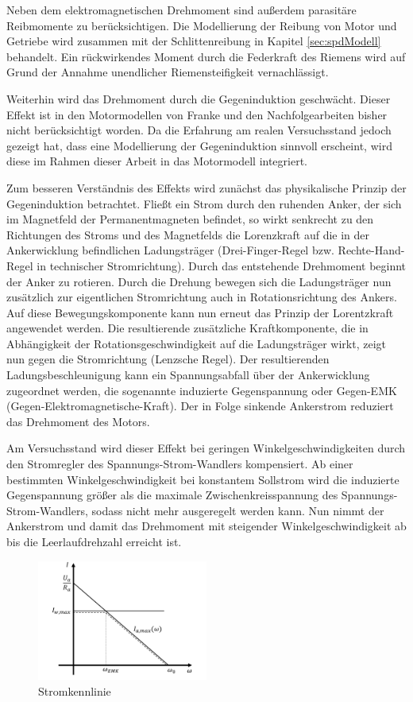 Neben dem elektromagnetischen Drehmoment sind außerdem parasitäre Reibmomente zu berücksichtigen. Die Modellierung der Reibung von Motor und Getriebe wird zusammen mit der Schlittenreibung in Kapitel \ref{sec:spdModell} behandelt. Ein rückwirkendes Moment durch die Federkraft des Riemens wird auf Grund der Annahme unendlicher Riemensteifigkeit vernachlässigt. 

Weiterhin wird das Drehmoment durch die Gegeninduktion geschwächt. Dieser Effekt ist in den Motormodellen von Franke \cite{franke} und den Nachfolgearbeiten bisher nicht berücksichtigt worden. Da die Erfahrung am realen Versuchsstand jedoch gezeigt hat, dass eine Modellierung der Gegeninduktion sinnvoll erscheint, wird diese im Rahmen dieser Arbeit in das Motormodell integriert.

Zum besseren Verständnis des Effekts wird zunächst das physikalische Prinzip der Gegeninduktion betrachtet. Fließt ein Strom durch den ruhenden Anker, der sich im Magnetfeld der Permanentmagneten befindet, so wirkt senkrecht zu den Richtungen des Stroms und des Magnetfelds die Lorenzkraft auf die in der Ankerwicklung befindlichen Ladungsträger (Drei-Finger-Regel bzw. Rechte-Hand-Regel in technischer Stromrichtung). Durch das entstehende Drehmoment beginnt der Anker zu rotieren. Durch die Drehung bewegen sich die Ladungsträger nun zusätzlich zur eigentlichen Stromrichtung auch in Rotationsrichtung des Ankers. Auf diese Bewegungskomponente kann nun erneut das Prinzip der Lorentzkraft angewendet werden. Die resultierende zusätzliche Kraftkomponente, die in Abhängigkeit der Rotationsgeschwindigkeit auf die Ladungsträger wirkt, zeigt nun gegen die Stromrichtung (Lenzsche Regel). Der resultierenden Ladungsbeschleunigung kann ein Spannungsabfall über der Ankerwicklung zugeordnet werden, die sogenannte induzierte Gegenspannung oder Gegen-EMK (Gegen-Elektromagnetische-Kraft). Der in Folge sinkende Ankerstrom reduziert das Drehmoment des Motors. \cite{binder}

Am Versuchsstand wird dieser Effekt bei geringen Winkelgeschwindigkeiten durch den Stromregler des Spannungs-Strom-Wandlers kompensiert. Ab einer bestimmten Winkelgeschwindigkeit bei konstantem Sollstrom wird die induzierte Gegenspannung größer als die maximale Zwischenkreisspannung des Spannungs-Strom-Wandlers, sodass nicht mehr ausgeregelt werden kann. Nun nimmt der Ankerstrom und damit das Drehmoment mit steigender Winkelgeschwindigkeit ab bis die Leerlaufdrehzahl erreicht ist. 

\begin{figure}[htbp]
	\centering
		\includegraphics[width=0.50\textwidth]{Bilder/Modellierung/Stromkennlinie.pdf}
	\caption{Stromkennlinie}
	\label{fig:Stromkennlinie}
\end{figure}

